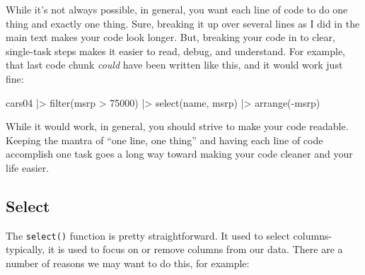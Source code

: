 \documentclass[
  letterpaper,
]{book}
\newenvironment{Shaded}{\begin{snugshade}}{\end{snugshade}}
\newcommand{\DecValTok}[1]{\textcolor[rgb]{0.68,0.00,0.00}{#1}}
\newcommand{\FunctionTok}[1]{\textcolor[rgb]{0.28,0.35,0.67}{#1}}
\newcommand{\NormalTok}[1]{\textcolor[rgb]{0.00,0.23,0.31}{#1}}
\newcommand{\SpecialCharTok}[1]{\textcolor[rgb]{0.37,0.37,0.37}{#1}}
\begin{document}
\begin{tcolorbox}[enhanced jigsaw, colframe=quarto-callout-tip-color-frame, breakable, arc=.35mm, bottomtitle=1mm, bottomrule=.15mm, colbacktitle=quarto-callout-tip-color!10!white, rightrule=.15mm, colback=white, opacityback=0, opacitybacktitle=0.6, coltitle=black, left=2mm, toptitle=1mm, toprule=.15mm, titlerule=0mm, leftrule=.75mm, title=\textcolor{quarto-callout-tip-color}{\faLightbulb}\hspace{0.5em}{Tip from the Helpdesk: One Line, One Thing}]

While it's not always possible, in general, you want each line of code
to do one thing and exactly one thing. Sure, breaking it up over several
lines as I did in the main text makes your code look longer. But,
breaking your code in to clear, single-task steps makes it easier to
read, debug, and understand. For example, that last code chunk
\emph{could} have been written like this, and it would work just fine:

\begin{Shaded}
\begin{Highlighting}[]
\NormalTok{cars04 }\SpecialCharTok{|\textgreater{}} \FunctionTok{filter}\NormalTok{(msrp }\SpecialCharTok{\textgreater{}} \DecValTok{75000}\NormalTok{) }\SpecialCharTok{|\textgreater{}} \FunctionTok{select}\NormalTok{(name, msrp) }\SpecialCharTok{|\textgreater{}} \FunctionTok{arrange}\NormalTok{(}\SpecialCharTok{{-}}\NormalTok{msrp)}
\end{Highlighting}
\end{Shaded}

While it would work, in general, you should strive to make your code
readable. Keeping the mantra of ``one line, one thing'' and having each
line of code accomplish one task goes a long way toward making your code
cleaner and your life easier.

\end{tcolorbox}

\subsection{Select}\label{select}

The \texttt{select()} function is pretty straightforward. It used to
select columns-typically, it is used to focus on or remove columns from
our data. There are a number of reasons we may want to do this, for
example:
\end{document}
